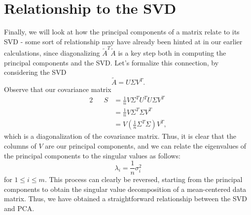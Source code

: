 \documentclass[letterpaper]{article}
\theoremstyle{remark}
\renewcommand{\tilde}[1]{\widetilde{#1}}
\newcommand{\eqn}[1]{\begin{alignat*}{2}#1\end{alignat*}}
\begin{document}
\section{Relationship to the SVD}
Finally, we will look at how the principal components of a matrix relate to its SVD - some sort of relationship may have already been hinted at in our earlier calculations, since diagonalizing $\tilde{A}^T\tilde{A}$ is a key step both in computing the principal components and the SVD. Let's formalize this connection, by considering the SVD
\[
    \tilde{A} = U \Sigma V^T.
\]
Observe that our covariance matrix
\eqn{
    && S &= \frac{1}{n} V\Sigma^T U^T U \Sigma V^T \\
    &&&= \frac{1}{n} V\Sigma^T\Sigma V^T \\
    &&&= V\left(\frac{1}{n}\Sigma^T\Sigma\right)V^T,
}
which is a diagonalization of the covariance matrix. Thus, it is clear that the columns of $V$ are our principal components, and we can relate the eigenvalues of the principal components to the singular values as follows:
\[
    \lambda_i = \frac{1}{n} \sigma_i^2
\]
for $1 \le i \le m$. This process can clearly be reversed, starting from the principal components to obtain the singular value decomposition of a mean-centered data matrix. Thus, we have obtained a straightforward relationship between the SVD and PCA.
\end{document}
